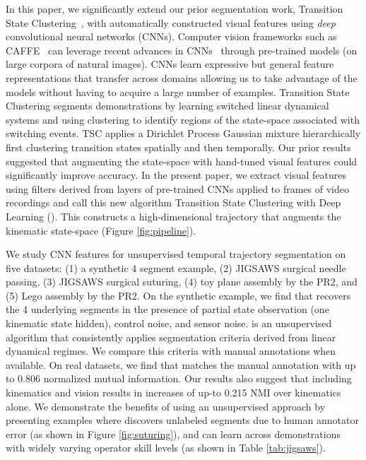 \documentclass[0-main.tex]{subfiles}
\begin{document}
In this paper, we significantly extend our prior segmentation work, Transition State Clustering~\cite{krishnan2015tsc}, with automatically constructed visual features using \textit{deep} convolutional neural networks (CNNs).
Computer vision frameworks such as CAFFE~\cite{jia2014caffe} can leverage recent advances in CNNs~\cite{krizhevsky2012imagenet, jia2014caffe, long2014fully} through pre-trained models (on large corpora of natural images). 
CNNs learn expressive but general feature representations that transfer across domains allowing us to take advantage of the models without having to acquire a large number of examples. 
Transition State Clustering segments demonstrations by learning switched linear dynamical systems and using clustering to identify regions of the state-space associated with switching events.
TSC applies a Dirichlet Process Gaussian mixture hierarchically first clustering transition states spatially and then temporally.
Our prior results suggested that augmenting the state-space with hand-tuned visual features could significantly improve accuracy.
In the present paper, we extract visual features using filters derived from layers of pre-trained CNNs applied to frames of video recordings and call this new algorithm Transition State Clustering with Deep Learning (\tsc).
This constructs a high-dimensional trajectory that augments the kinematic state-space (Figure \ref{fig:pipeline}).


We study CNN features for unsupervised temporal trajectory segmentation on five datasets: (1) a synthetic 4 segment example, (2) JIGSAWS surgical needle passing, (3) JIGSAWS surgical suturing, (4) toy plane assembly by the PR2, and (5) Lego assembly by the PR2.
On the synthetic example, we find that \tsc recovers the 4 underlying segments in the presence of partial state observation (one kinematic state hidden), control noise, and sensor noise. 
\tsc is an unsupervised algorithm that consistently applies segmentation criteria derived from linear dynamical regimes.
We compare this criteria with manual annotations when available.
On real datasets, we find that \tsc matches the manual annotation with up to 0.806 normalized mutual information.
Our results also suggest that including kinematics and vision results in increases of up-to 0.215 NMI over kinematics alone.
We demonstrate the benefits of using an unsupervised approach by presenting examples where \tsc discovers unlabeled segments due to human annotator error (as shown in Figure \ref{fig:suturing}), and can learn across demonstrations with widely varying operator skill levels (as shown in Table \ref{tab:jigsaws}).
\end{document}
